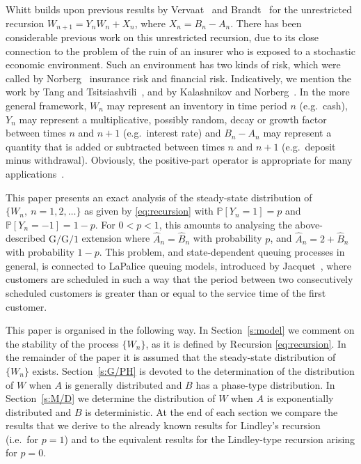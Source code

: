 \documentclass[reqno, 11pt, a4paper]{article}
\theoremstyle{plain}
\theoremstyle{remark}
\numberwithin{equation}{section}
\begin{document}
Whitt \cite{whitt90} builds upon previous results by Vervaat~\cite{vervaat79} and Brandt~\cite{brandt86} for the unrestricted recursion $W_{n+1}=Y_nW_n+X_n$, where $X_n=B_n-A_n$.
There has been considerable previous work on this unrestricted recursion, due to its close connection to the problem of the ruin of an insurer who is exposed to a stochastic economic environment. Such an environment has two kinds of risk, which were called by Norberg~\cite{norberg99} insurance risk and financial risk. Indicatively, we mention the work by Tang and Tsitsiashvili~\cite{tang03}, and by Kalashnikov and Norberg~\cite{kalashnikov02a}. In the more general framework, $W_n$ may represent an inventory in time period $n$ (e.g.\ cash), $Y_n$ may represent a multiplicative, possibly random, decay or growth factor between times $n$ and $n+1$ (e.g.\ interest rate) and $B_n-A_n$ may represent a quantity that is added or subtracted between times $n$ and $n+1$ (e.g.\ deposit minus withdrawal). Obviously, the positive-part operator is appropriate for many applications~\cite{whitt90}.

This paper presents an exact analysis of the steady-state distribution of $\{W_n, ~ n=1,2,\dots\}$ as given by
\eqref{eq:recursion} with ${\mathbb{P}}[Y_n=1]=p$ and ${\mathbb{P}}[Y_n=-1]=1-p$. For $0<p<1$, this amounts to analysing
the above-described $\mathrm{G/G/1}$ extension where $\widehat{A}_n=\widehat{B}_n$ with probability $p$, and
$\widehat{A}_n=2+\widehat{B}_n$ with probability $1-p$. This problem, and state-dependent queuing processes in general, is connected to LaPalice queuing models, introduced by Jacquet~\cite{jacquet92}, where customers are scheduled in such a way that the period between two consecutively scheduled customers is greater than or equal to the service time of the first customer.

This paper is organised in the following way. In Section~\ref{s:model} we comment on the stability of the process $\{W_n\}$, as it is defined by Recursion \eqref{eq:recursion}. In the remainder of the paper it is assumed that the steady-state distribution of $\{W_n\}$ exists. Section~\ref{s:G/PH} is devoted to the determination of the distribution of $W$ when $A$ is generally distributed and $B$ has a phase-type distribution. In Section~\ref{s:M/D} we determine the distribution of $W$ when $A$ is exponentially distributed and $B$ is deterministic. At the end of each section we compare the results that we derive to the already known results for Lindley's recursion (i.e.\ for $p=1$) and to the equivalent results for the Lindley-type recursion arising for $p=0$.
\end{document}
